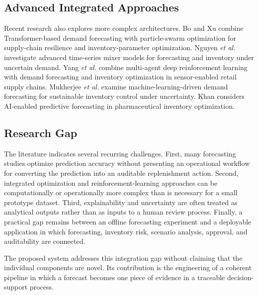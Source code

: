 \documentclass[9pt,conference]{IEEEtran}
\providecommand{\syscite}[1]{}
\begin{document}
\subsection{Advanced Integrated Approaches}
Recent research also explores more complex architectures. \syscite{[cite: 1]} Bo and Xu combine Transformer-based demand forecasting with particle-swarm optimization for supply-chain resilience and inventory-parameter optimization. \syscite{[cite: 1]} Nguyen \textit{et al.} investigate advanced time-series mixer models for forecasting and inventory under uncertain demand. \syscite{[cite: 1]} Yang \textit{et al.} combine multi-agent deep reinforcement learning with demand forecasting and inventory optimization in sensor-enabled retail supply chains. \syscite{[cite: 1]} Mukherjee \textit{et al.} examine machine-learning-driven demand forecasting for sustainable inventory control under uncertainty. \syscite{[cite: 1]} Khan considers AI-enabled predictive forecasting in pharmaceutical inventory optimization. \syscite{[cite: 1]}

\subsection{Research Gap}
The literature indicates several recurring challenges. \syscite{[cite: 1]} First, many forecasting studies optimize prediction accuracy without presenting an operational workflow for converting the prediction into an auditable replenishment action. \syscite{[cite: 1]} Second, integrated optimization and reinforcement-learning approaches can be computationally or operationally more complex than is necessary for a small prototype dataset. \syscite{[cite: 1]} Third, explainability and uncertainty are often treated as analytical outputs rather than as inputs to a human review process. \syscite{[cite: 1]} Finally, a practical gap remains between an offline forecasting experiment and a deployable application in which forecasting, inventory risk, scenario analysis, approval, and auditability are connected. \syscite{[cite: 1]} 

The proposed system addresses this integration gap without claiming that the individual components are novel. \syscite{[cite: 1]} Its contribution is the engineering of a coherent pipeline in which a forecast becomes one piece of evidence in a traceable decision-support process. \syscite{[cite: 1]}
\end{document}

